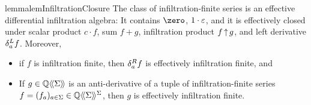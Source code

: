 \begin{restatable}{lemma}{lemInfiltrationClosure}
    \label{lem:infiltration closure}
    The class of infiltration-finite series
    is an effective differential infiltration algebra:
    It contains $\zero$, $1 \cdot \varepsilon$, and it is effectively closed under
    scalar product $c \cdot f$,
    sum $f + g$,
    infiltration product $f \operatorname{\uparrow} g$,
    and left derivative $\delta^L_{a} f$.
    Moreover,
    \begin{itemize}
        \item if $f$ is infiltration finite,
        then $\delta^R_{a} f$ is effectively infiltration finite, and
        \item If $g \in \mathbb Q\langle\!\langle\Sigma\rangle\!\rangle$ is an anti-derivative
        of a tuple of infiltration-finite series $f = (f_a)_{a \in \Sigma} \in \mathbb Q\langle\!\langle\Sigma\rangle\!\rangle^\Sigma$,
        then $g$ is effectively infiltration finite.
    \end{itemize}
\end{restatable}
%
